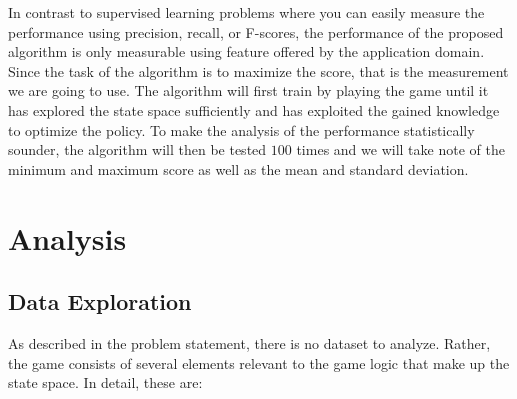 \documentclass[a4paper,10pt]{article}
\begin{document}
In contrast to supervised learning problems where you can easily measure the performance using precision, recall, or F-scores, the performance of the proposed algorithm is only measurable using feature offered by the application domain.
Since the task of the algorithm is to maximize the score, that is the measurement we are going to use.
The algorithm will first train by playing the game until it has explored the state space sufficiently and has exploited the gained knowledge to optimize the policy.
To make the analysis of the performance statistically sounder, the algorithm will then be tested $100$ times and we will take note of the minimum and maximum score as well as the mean and standard deviation.
\section{Analysis}

\subsection{Data Exploration}
\label{dataexploration}

As described in the problem statement, there is no dataset to analyze.
Rather, the game consists of several elements relevant to the game logic that make up the state space.
In detail, these are:
\end{document}
